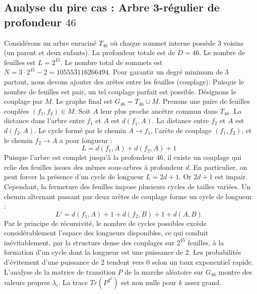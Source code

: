 \documentclass[11pt,a4paper]{article}
\begin{document}
\subsection{Analyse du pire cas : Arbre 3-régulier de profondeur $46$}
Considérons un arbre enraciné $T_{46}$ où chaque sommet interne possède 3 voisins (un parent et deux enfants).
La profondeur totale est de $D = 46$.
Le nombre de feuilles est $L = 2^{45}$.
Le nombre total de sommets est $N = 3 \cdot 2^{45} - 2 = 105553116266494$.
Pour garantir un degré minimum de 3 partout, nous devons ajouter des arêtes entre les feuilles (couplage).
Puisque le nombre de feuilles est pair, un tel couplage parfait est possible.
Désignons le couplage par $M$. Le graphe final est $G_{46} = T_{46} \cup M$.
Prenons une paire de feuilles couplées $(f_1, f_2) \in M$.
Soit $A$ leur plus proche ancêtre commun dans $T_{46}$.
La distance dans l'arbre entre $f_1$ et $A$ est $d(f_1, A)$.
La distance entre $f_2$ et $A$ est $d(f_2, A)$.
Le cycle formé par le chemin $A \to f_1$, l'arête de couplage $(f_1, f_2)$, et le chemin $f_2 \to A$ a pour longueur :
$$ L = d(f_1, A) + d(f_2, A) + 1 $$
Puisque l'arbre est complet jusqu'à la profondeur $46$, il existe un couplage qui relie des feuilles issues des mêmes sous-arbres à profondeur $d$.
En particulier, on peut forcer la présence d'un cycle de longueur $L = 2d + 1$. Or $2d+1$ est impair.
Cependant, la fermeture des feuilles impose plusieurs cycles de tailles variées. Un chemin alternant passant par deux arêtes de couplage forme un cycle de longueur :
$$ L' = d(f_1, A) + 1 + d(f_2, B) + 1 + d(A, B) $$
Par le principe de récursivité, le nombre de cycles possibles excède considérablement l'espace des longueurs disponibles, ce qui conduit inévitablement, par la structure dense des couplages sur $2^{45}$ feuilles, à la formation d'un cycle dont la longueur est une puissance de 2. Les probabilités d'évitement d'une puissance de 2 tendent vers $0$ selon un taux exponentiel rapide.
L'analyse de la matrice de transition $P$ de la marche aléatoire sur $G_{46}$ montre des valeurs propres $\lambda_i$. La trace $Tr(P^{2^k})$ est non nulle pour $k$ assez grand.
\end{document}
